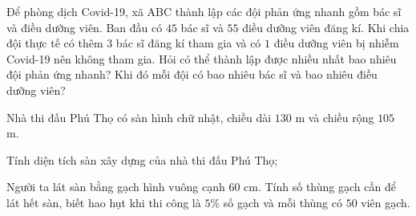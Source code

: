 \begin{bt} Để phòng dịch Covid-19, xã ABC thành lập các đội phản ứng nhanh gồm bác sĩ và điều dưỡng viên. Ban đầu có $45$ bác sĩ và $55$ điều dưỡng viên đăng kí. Khi chia đội thực tế có thêm $3$ bác sĩ đăng kí tham gia và có $1$ điều dưỡng viên bị nhiễm Covid-19 nên không tham gia. Hỏi có thể thành lập được nhiều nhất bao nhiêu đội phản ứng nhanh? Khi đó mỗi đội có bao nhiêu bác sĩ và bao nhiêu điều dưỡng viên?
\end{bt}



\begin{bt} Nhà thi đấu Phú Thọ có sàn hình chữ nhật, chiều dài $130$ m và chiều rộng $105$ m. 
	\begin{listEX}
		\item Tính diện tích sàn xây dựng của nhà thi đấu Phú Thọ;
		\item Người ta lát sàn bằng gạch hình vuông cạnh $60$ cm. Tính số thùng gạch cần để lát hết sàn, biết hao hụt khi thi công là $5\%$ số gạch và mỗi thùng có $50$ viên gạch.
	\end{listEX}
\end{bt}



